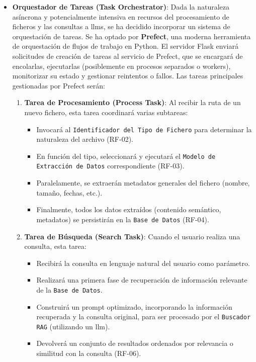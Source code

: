 \begin{itemize}
    \item \textbf{Orquestador de Tareas (Task Orchestrator)}:
    Dada la naturaleza asíncrona y potencialmente intensiva en recursos del procesamiento de ficheros y las consultas a \glspl{llm}, se ha decidido incorporar un sistema de orquestación de tareas. Se ha optado por \textbf{Prefect}, una moderna herramienta de orquestación de flujos de trabajo en Python. El servidor Flask enviará solicitudes de creación de tareas al servicio de Prefect, que se encargará de encolarlas, ejecutarlas (posiblemente en procesos separados o workers), monitorizar su estado y gestionar reintentos o fallos. Las tareas principales gestionadas por Prefect serán:
    \begin{enumerate}
        \item \textbf{Tarea de Procesamiento (Process Task)}:
            Al recibir la ruta de un nuevo fichero, esta tarea coordinará varias subtareas:
            \begin{itemize}
                \item Invocará al \texttt{Identificador del Tipo de Fichero} para determinar la naturaleza del archivo (RF-02).
                \item En función del tipo, seleccionará y ejecutará el \texttt{Modelo de Extracción de Datos} correspondiente (RF-03).
                \item Paralelamente, se extraerán metadatos generales del fichero (nombre, tamaño, fechas, etc.).
                \item Finalmente, todos los datos extraídos (contenido semántico, metadatos) se persistirán en la \texttt{Base de Datos} (RF-04).
            \end{itemize}
        \item \textbf{Tarea de Búsqueda (Search Task)}:
            Cuando el usuario realiza una consulta, esta tarea:
            \begin{itemize}
                \item Recibirá la consulta en lenguaje natural del usuario como parámetro.
                \item Realizará una primera fase de recuperación de información relevante de la \texttt{Base de Datos}.
                \item Construirá un prompt optimizado, incorporando la información recuperada y la consulta original, para ser procesado por el \texttt{Buscador RAG} (utilizando un \gls{llm}).
                \item Devolverá un conjunto de resultados ordenados por relevancia o similitud con la consulta (RF-06).
            \end{itemize}
    \end{enumerate}


\end{itemize}
